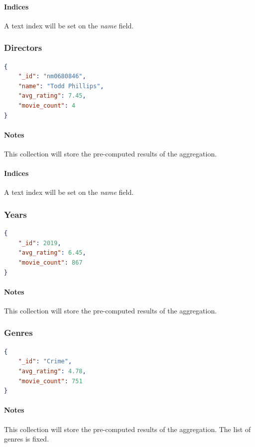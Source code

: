 \documentclass[11pt]{article}
\begin{document}
\paragraph{Indices}
A text index will be set on the \emph{name} field.

\subsubsection{Directors}
\label{sec:directors}

\begin{lstlisting}[language=json]	
{
	"_id": "nm0680846",
	"name": "Todd Phillips",
	"avg_rating": 7.45,
	"movie_count": 4	
}
\end{lstlisting}

\paragraph{Notes}
This collection will store the pre-computed results of the aggregation.

\paragraph{Indices}
A text index will be set on the \emph{name} field.

\subsubsection{Years}
\label{sec:years}

\begin{lstlisting}[language=json]	
{
	"_id": 2019,
	"avg_rating": 6.45,
	"movie_count": 867
}
\end{lstlisting}

\paragraph{Notes}
This collection will store the pre-computed results of the aggregation.

\subsubsection{Genres}
\label{sec:genres}

\begin{lstlisting}[language=json]	
{
	"_id": "Crime",
	"avg_rating": 4.78,
	"movie_count": 751
}
\end{lstlisting}

\paragraph{Notes}
This collection will store the pre-computed results of the aggregation.
The list of genres is fixed.
\end{document}
